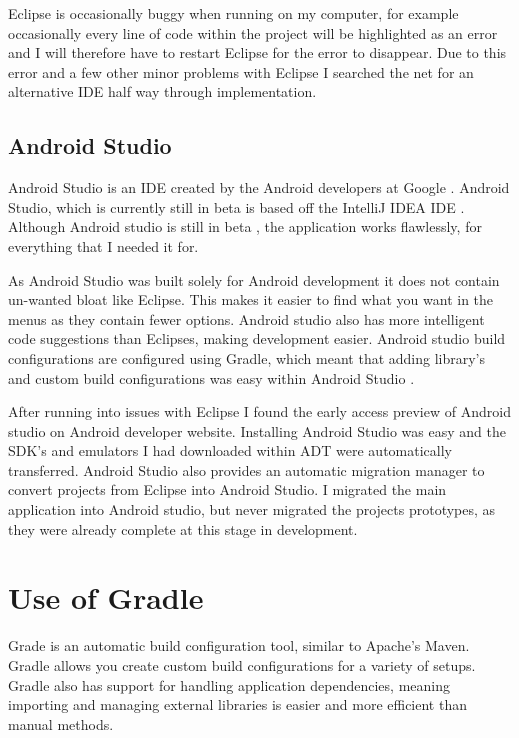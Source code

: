 Eclipse is occasionally buggy when running on my computer, for example occasionally every line of code within the project will be highlighted as an error and I will therefore have to restart Eclipse for the error to disappear. Due to this error and a few other minor problems with Eclipse I searched the net for an alternative IDE half way through implementation.


\subsection{Android Studio}

Android Studio is an IDE created by the Android developers at Google \cite{android_studio}. Android Studio, which is currently still in beta is based off the IntelliJ IDEA IDE \cite{android_studio}. Although Android studio is still in beta \cite{android_studio}, the application works flawlessly, for everything that I needed it for.

As Android Studio was built solely for Android development it does not contain un-wanted  bloat like Eclipse. This makes it easier to find what you want in the menus as they contain fewer options. Android studio also has more intelligent code suggestions than Eclipses, making development easier. Android studio build configurations are configured using Gradle, which meant that adding library’s and custom build configurations was easy within Android Studio \cite{android_studio}.

After running into issues with Eclipse I found the early access preview of Android studio on Android developer website. Installing Android Studio was easy and the SDK’s and emulators I had downloaded within ADT were automatically transferred. Android Studio also provides an automatic migration manager to convert projects from Eclipse into Android Studio. I migrated the main application into Android studio, but never migrated the projects prototypes, as they were already complete at this stage in development.

\section{Use of Gradle}

Grade \cite{gradle} is an automatic build configuration tool, similar to Apache’s Maven. Gradle allows you create custom build configurations \cite{gradle} for a variety of setups. Gradle also has support for handling application dependencies, meaning importing and managing external libraries is easier and more efficient than manual methods.

